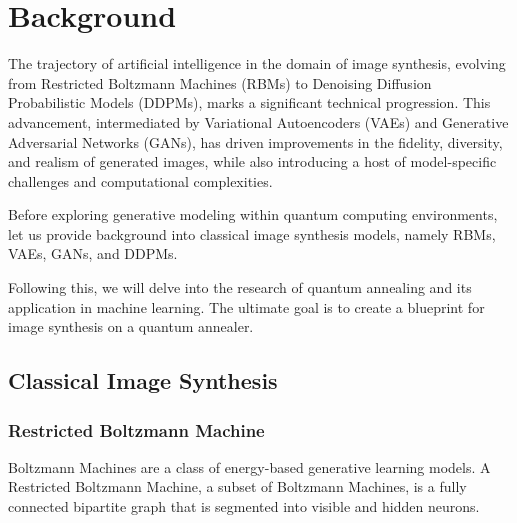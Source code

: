 \documentclass[technologies,article,accept,pdftex,moreauthors]{Definitions/mdpi}
\begin{document}
\section{Background}
The trajectory of artificial intelligence in the domain of image synthesis, evolving from Restricted Boltzmann Machines (RBMs) to Denoising Diffusion Probabilistic Models (DDPMs), marks a significant technical progression. This advancement, intermediated by Variational Autoencoders (VAEs) and Generative Adversarial Networks (GANs), has driven improvements in the fidelity, diversity, and realism of generated images, while also introducing a host of model-specific challenges and computational complexities.


Before exploring generative modeling within quantum computing environments, let us provide background into classical image synthesis models, namely RBMs, VAEs, GANs, and DDPMs.


Following this, we will delve into the research of quantum annealing and its application in machine learning. The ultimate goal is to create a blueprint for image synthesis on a quantum annealer.

\subsection{Classical Image Synthesis}
\subsubsection{Restricted Boltzmann Machine}
Boltzmann Machines are a class of energy-based generative learning models. A Restricted Boltzmann Machine, a subset of Boltzmann Machines, is a fully connected bipartite graph that is segmented into visible and hidden neurons.
\end{document}
